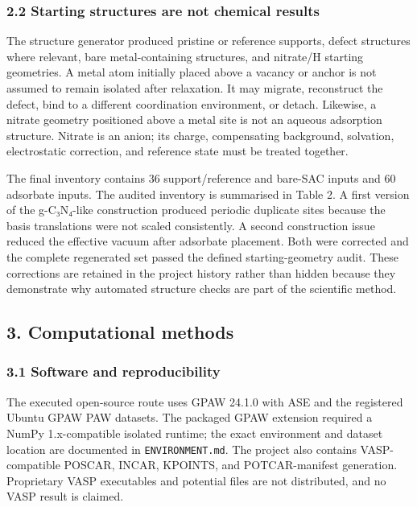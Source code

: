 \documentclass[
]{article}
\begin{document}
\hypertarget{starting-structures-are-not-chemical-results}{%
\subsubsection{2.2 Starting structures are not chemical
results}\label{starting-structures-are-not-chemical-results}}

The structure generator produced pristine or reference supports, defect
structures where relevant, bare metal-containing structures, and
nitrate/H starting geometries. A metal atom initially placed above a
vacancy or anchor is not assumed to remain isolated after relaxation. It
may migrate, reconstruct the defect, bind to a different coordination
environment, or detach. Likewise, a nitrate geometry positioned above a
metal site is not an aqueous adsorption structure. Nitrate is an anion;
its charge, compensating background, solvation, electrostatic
correction, and reference state must be treated together.

The final inventory contains 36 support/reference and bare-SAC inputs
and 60 adsorbate inputs. The audited inventory is summarised in Table 2.
A first version of the g-C₃N₄-like construction produced periodic
duplicate sites because the basis translations were not scaled
consistently. A second construction issue reduced the effective vacuum
after adsorbate placement. Both were corrected and the complete
regenerated set passed the defined starting-geometry audit. These
corrections are retained in the project history rather than hidden
because they demonstrate why automated structure checks are part of the
scientific method.

\hypertarget{computational-methods}{%
\subsection{3. Computational methods}\label{computational-methods}}

\hypertarget{software-and-reproducibility}{%
\subsubsection{3.1 Software and
reproducibility}\label{software-and-reproducibility}}

The executed open-source route uses GPAW 24.1.0 with ASE and the
registered Ubuntu GPAW PAW datasets. The packaged GPAW extension
required a NumPy 1.x-compatible isolated runtime; the exact environment
and dataset location are documented in \texttt{ENVIRONMENT.md}. The
project also contains VASP-compatible POSCAR, INCAR, KPOINTS, and
POTCAR-manifest generation. Proprietary VASP executables and potential
files are not distributed, and no VASP result is claimed.
\end{document}
